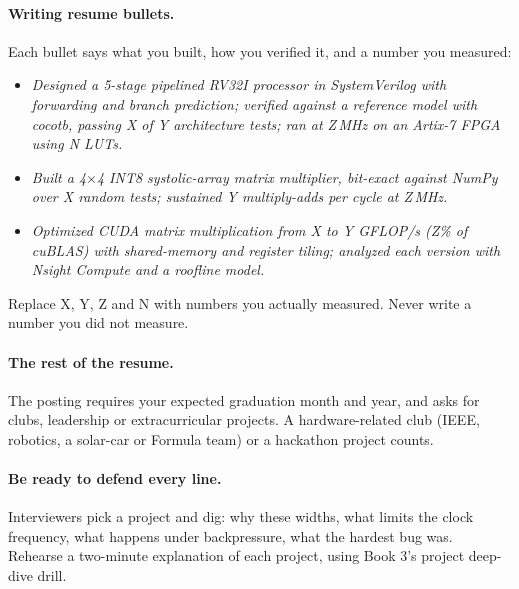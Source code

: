 \paragraph{Writing resume bullets.} Each bullet says what you built, how you verified it, and a number you measured:

\begin{remember}
\begin{itemize}
  \item \textit{Designed a 5-stage pipelined RV32I processor in SystemVerilog with forwarding and branch prediction; verified against a reference model with cocotb, passing X of Y architecture tests; ran at Z\,MHz on an Artix-7 FPGA using N LUTs.}
  \item \textit{Built a 4$\times$4 INT8 systolic-array matrix multiplier, bit-exact against NumPy over X random tests; sustained Y multiply-adds per cycle at Z\,MHz.}
  \item \textit{Optimized CUDA matrix multiplication from X to Y GFLOP/s (Z\% of cuBLAS) with shared-memory and register tiling; analyzed each version with Nsight Compute and a roofline model.}
\end{itemize}
Replace X, Y, Z and N with numbers you actually measured. Never write a number you did not measure.
\end{remember}

\paragraph{The rest of the resume.} The posting requires your expected graduation month and year, and asks for clubs, leadership or extracurricular projects. A hardware-related club (IEEE, robotics, a solar-car or Formula team) or a hackathon project counts.

\paragraph{Be ready to defend every line.} Interviewers pick a project and dig: why these widths, what limits the clock frequency, what happens under backpressure, what the hardest bug was. Rehearse a two-minute explanation of each project, using Book 3's project deep-dive drill.
